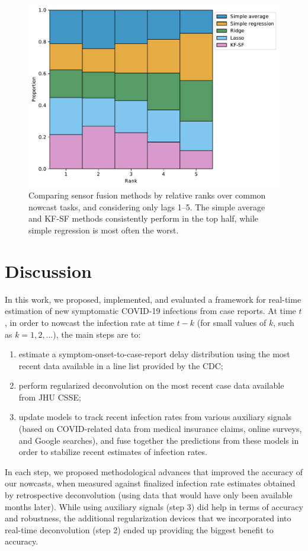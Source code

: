 \documentclass[sts]{imsart}
\theoremstyle{plain}
\theoremstyle{definition}
\theoremstyle{remark}
\begin{document}
\begin{figure}[tb]
\centering
\includegraphics[width=0.975\linewidth]{./figures/rankplot_fusion_no_claims.pdf}
\caption{Comparing sensor fusion methods by relative ranks over common nowcast 
  tasks, and considering only lags 1--5. The simple average and KF-SF methods
  consistently perform in the top half, while simple regression is most often
  the worst.}
	\label{fig:rank_ensemble}
\end{figure}

\section{Discussion}
\label{sec:discussion}

In this work, we proposed, implemented, and evaluated a framework for real-time
estimation of new symptomatic COVID-19 infections from case reports. At time
$t$, in order to nowcast the infection rate at time $t-k$ (for small values of
$k$, such as $k=1,2,\ldots$), the main steps are to:  
\begin{enumerate}
\item estimate a symptom-onset-to-case-report delay distribution using the most 
  recent data available in a line list provided by the CDC;  
\item perform regularized deconvolution on the most recent case data available 
  from JHU CSSE; 
\item update models to track recent infection rates from various auxiliary
  signals (based on COVID-related data from medical insurance claims, online
  surveys, and Google searches), and fuse together the predictions from these
  models in order to stabilize recent estimates of infection rates. 
\end{enumerate}
In each step, we proposed methodological advances that improved the accuracy of
our nowcasts, when measured against finalized infection rate estimates obtained
by retrospective deconvolution (using data that would have only been available 
months later). While using auxiliary signals (step 3) did help in terms of
accuracy and robustness, the additional regularization devices that we
incorporated into real-time deconvolution (step 2) ended up providing the
biggest benefit to accuracy. 
\end{document}
